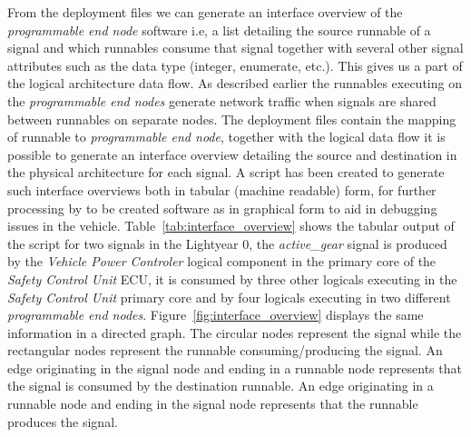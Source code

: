 From the deployment files we can generate an interface overview of the \textit{programmable end node} software i.e, a list detailing the source runnable of a signal and which runnables consume that signal together with several other signal attributes such as the data type (integer, enumerate, etc.). This gives us a part of the logical architecture data flow. As described earlier the runnables executing on the \textit{programmable end nodes} generate network traffic when signals are shared between runnables on separate nodes. The deployment files contain the mapping of runnable to \textit{programmable end node}, together with the logical data flow it is possible to generate an interface overview detailing the source and destination in the physical architecture for each signal. A script has been created to generate such interface overviews both in tabular (machine readable) form, for further processing by to be created software as in graphical form to aid in debugging issues in the vehicle. Table~\ref{tab:interface_overview} shows the tabular output of the script for two signals in the Lightyear 0, the \textit{active\_gear} signal is produced by the \textit{Vehicle Power Controler} logical component in the primary core of the \textit{Safety Control Unit} ECU, it is consumed by three other logicals executing in the \textit{Safety Control Unit} primary core and by four logicals executing in two different \textit{programmable end nodes}. Figure~\ref{fig:interface_overview} displays the same information in a directed graph. The circular nodes represent the signal while the rectangular nodes represent the runnable consuming/producing the signal. An edge originating in the signal node and ending in a runnable node represents that the signal is consumed by the destination runnable. An edge originating in a runnable node and ending in the signal node represents that the runnable produces the signal.

